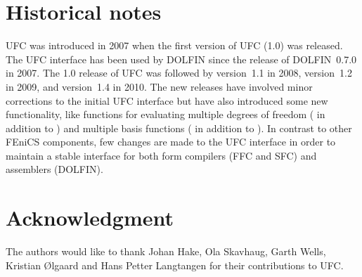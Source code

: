 \section{Historical notes}

UFC was introduced in 2007 when the first version of UFC (1.0) was
released. The UFC interface has been used by DOLFIN since the release
of DOLFIN~0.7.0 in 2007. The 1.0 release of UFC was followed by
version~1.1 in 2008, version~1.2 in 2009, and version~1.4 in 2010. The
new releases have involved minor corrections to the initial UFC
interface but have also introduced some new functionality, like
functions for evaluating multiple degrees of freedom
( in addition to ) and multiple
basis functions ( in addition to
). In contrast to other FEniCS components, few
changes are made to the UFC interface in order to maintain a stable
interface for both form compilers (FFC and SFC) and assemblers
(DOLFIN).

\section*{Acknowledgment}

The authors would like to thank Johan Hake, Ola Skavhaug, Garth Wells,
Kristian \O{}lgaard and Hans Petter Langtangen for their contributions
to UFC.
